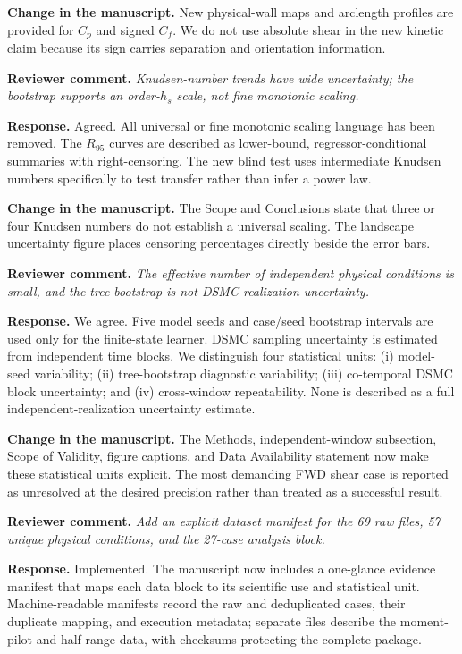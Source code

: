 \documentclass[11pt]{article}
\newcommand{\reviewer}[1]{\vspace{0.4em}\noindent\textbf{Reviewer comment.} \emph{#1}}
\newcommand{\response}{\noindent\textbf{Response.} }
\newcommand{\change}{\noindent\textbf{Change in the manuscript.} }
\begin{document}
\change New physical-wall maps and arclength profiles are provided for $C_p$ and signed $C_f$. We do not use absolute shear in the new kinetic claim because its sign carries separation and orientation information.

\reviewer{Knudsen-number trends have wide uncertainty; the bootstrap supports an order-$h_s$ scale, not fine monotonic scaling.}

\response Agreed. All universal or fine monotonic scaling language has been removed. The $R_{95}$ curves are described as lower-bound, regressor-conditional summaries with right-censoring. The new blind test uses intermediate Knudsen numbers specifically to test transfer rather than infer a power law.

\change The Scope and Conclusions state that three or four Knudsen numbers do not establish a universal scaling. The landscape uncertainty figure places censoring percentages directly beside the error bars.

\reviewer{The effective number of independent physical conditions is small, and the tree bootstrap is not DSMC-realization uncertainty.}

\response We agree. Five model seeds and case/seed bootstrap intervals are used only for the finite-state learner. DSMC sampling uncertainty is estimated from independent time blocks. We distinguish four statistical units: (i) model-seed variability; (ii) tree-bootstrap diagnostic variability; (iii) co-temporal DSMC block uncertainty; and (iv) cross-window repeatability. None is described as a full independent-realization uncertainty estimate.

\change The Methods, independent-window subsection, Scope of Validity, figure captions, and Data Availability statement now make these statistical units explicit. The most demanding FWD shear case is reported as unresolved at the desired precision rather than treated as a successful result.

\reviewer{Add an explicit dataset manifest for the 69 raw files, 57 unique physical conditions, and the 27-case analysis block.}

\response Implemented. The manuscript now includes a one-glance evidence manifest that maps each data block to its scientific use and statistical unit. Machine-readable manifests record the raw and deduplicated cases, their duplicate mapping, and execution metadata; separate files describe the moment-pilot and half-range data, with checksums protecting the complete package.
\end{document}

